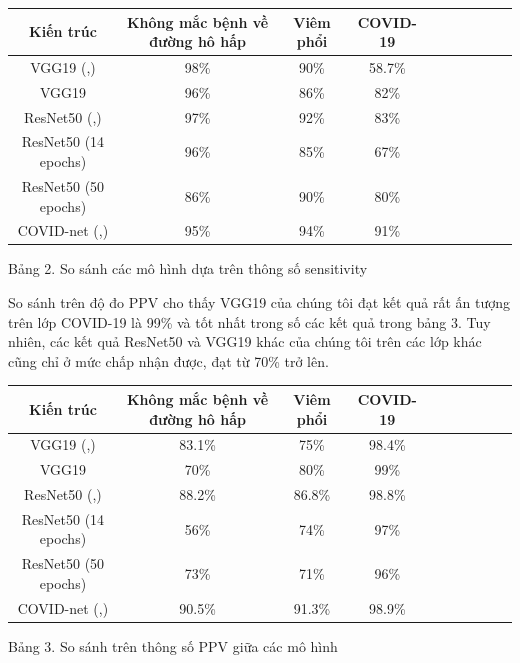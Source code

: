 \documentclass{article}
\begin{document}
\begin{center}
        \begin{tabular}{|c|c| c|c| c|c| c|c| c|c|}
        \hline
            Kiến trúc & Không mắc bệnh về đường hô hấp & Viêm phổi & COVID-19\\
            \hline
            VGG19 (\citeauthor{covidxdataset},\citeyear{covidxdataset}) & 98\% & 90\% & 58.7\% \\
            \hline
            VGG19 & 96\% & 86\% & 82\%\\
            \hline
            ResNet50 (\citeauthor{covidxdataset},\citeyear{covidxdataset}) & 97\% & 92\% & 83\% \\
            \hline
            ResNet50 (14 epochs) & 96\% & 85\% & 67\%\\
            \hline
            ResNet50 (50 epochs) & 86\% & 90\% & 80\%\\
            \hline
            COVID-net (\citeauthor{covidxdataset},\citeyear{covidxdataset}) & 95\% & 94\% & 91\%\\
        \hline 
        \end{tabular}
    \end{center}
\begin{center}
    Bảng 2. So sánh các mô hình dựa trên thông số sensitivity
\end{center}
So sánh trên độ đo PPV cho thấy VGG19 của chúng tôi đạt kết quả rất ấn tượng trên lớp COVID-19 là 99\% và tốt nhất trong số các kết quả trong bảng 3. Tuy nhiên, các kết quả ResNet50 và VGG19 khác của chúng tôi trên các lớp khác cũng chỉ ở mức chấp nhận được, đạt từ 70\% trở lên.\\

\begin{center}
        \begin{tabular}{|c|c| c|c| c|c| c|c| c|c|}
        \hline
            Kiến trúc & Không mắc bệnh về đường hô hấp & Viêm phổi & COVID-19\\
            \hline
            VGG19 (\citeauthor{covidxdataset},\citeyear{covidxdataset}) & 83.1\% & 75\% & 98.4\%\\
            \hline
            VGG19 & 70\% & 80\% & 99\%\\
            \hline
            ResNet50 (\citeauthor{covidxdataset},\citeyear{covidxdataset}) & 88.2\% & 86.8\% & 98.8\% \\
            \hline
            ResNet50 (14 epochs) & 56\% & 74\% & 97\%\\
            \hline
            ResNet50 (50 epochs) & 73\% & 71\% & 96\%\\
            \hline
            COVID-net (\citeauthor{covidxdataset},\citeyear{covidxdataset}) & 90.5\% & 91.3\% & 98.9\%\\
        \hline 
        \end{tabular}
    \end{center}
\begin{center}
    Bảng 3. So sánh trên thông số PPV giữa các mô hình
\end{center}
\end{document}

